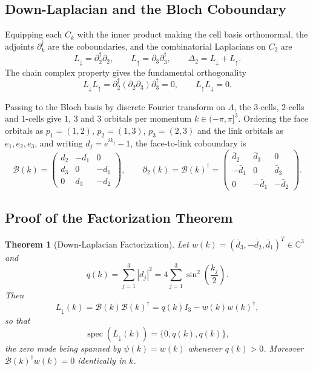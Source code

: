 \documentclass[11pt,a4paper]{article}
\newtheorem{theorem}{Theorem}[section]
\theoremstyle{definition}
\DeclareMathOperator{\spec}{spec}
\newcommand{\C}{\mathbb{C}}
\newcommand{\Ldn}{L_{\downarrow}}
\newcommand{\Lup}{L_{\uparrow}}
\newcommand{\dg}{^{\dagger}}
\newcommand{\Bc}{\mathcal{B}}          %
\begin{document}
\subsection{Down-Laplacian and the Bloch Coboundary}

Equipping each $C_k$ with the inner product making the cell basis orthonormal, the adjoints $\partial_k\dg$ are the coboundaries, and the combinatorial Laplacians on $C_2$ are
\begin{equation}\label{eq:laplacians_def}
  \Ldn = \partial_2\dg\partial_2, \qquad \Lup = \partial_3\partial_3\dg, \qquad \Delta_2 = \Ldn + \Lup .
\end{equation}
The chain complex property gives the fundamental orthogonality
\begin{equation}\label{eq:Ldn_Lup_ortho}
  \Ldn\Lup = \partial_2\dg(\partial_2\partial_3)\partial_3\dg = 0, \qquad \Lup\Ldn = 0 .
\end{equation}

Passing to the Bloch basis by discrete Fourier transform on $\Lambda$, the $3$-cells, $2$-cells and $1$-cells give $1$, $3$ and $3$ orbitals per momentum $k \in (-\pi,\pi]^3$. Ordering the face orbitals as $p_1 = (1,2)$, $p_2 = (1,3)$, $p_3 = (2,3)$ and the link orbitals as $e_1,e_2,e_3$, and writing $d_j = e^{ik_j}-1$, the face-to-link coboundary is
\begin{equation}\label{eq:B_matrix}
  \Bc(k) = \begin{pmatrix} d_2 & -d_1 & 0 \\ d_3 & 0 & -d_1 \\ 0 & d_3 & -d_2 \end{pmatrix},
  \qquad
  \partial_2(k) = \Bc(k)\dg = \begin{pmatrix} \bar d_2 & \bar d_3 & 0 \\ -\bar d_1 & 0 & \bar d_3 \\ 0 & -\bar d_1 & -\bar d_2 \end{pmatrix}.
\end{equation}

\subsection{Proof of the Factorization Theorem}

\begin{theorem}[Down-Laplacian Factorization]\label{thm:factorization_proof}
Let $w(k) = (\bar d_3, -\bar d_2, \bar d_1)^T \in \C^3$ and
\begin{equation}\label{eq:qk_def}
  q(k) = \sum_{j=1}^3 |d_j|^2 = 4\sum_{j=1}^3 \sin^2\!\left(\frac{k_j}{2}\right).
\end{equation}
Then
\begin{equation}\label{eq:Ldn_proj}
  \Ldn(k) = \Bc(k)\Bc(k)\dg = q(k)I_3 - w(k)w(k)\dg,
\end{equation}
so that
\begin{equation}\label{eq:Ldn_spec}
  \spec(\Ldn(k)) = \{0, q(k), q(k)\},
\end{equation}
the zero mode being spanned by $\psi(k) = w(k)$ whenever $q(k) > 0$. Moreover $\Bc(k)\dg w(k) = 0$ identically in $k$.
\end{theorem}
\end{document}

